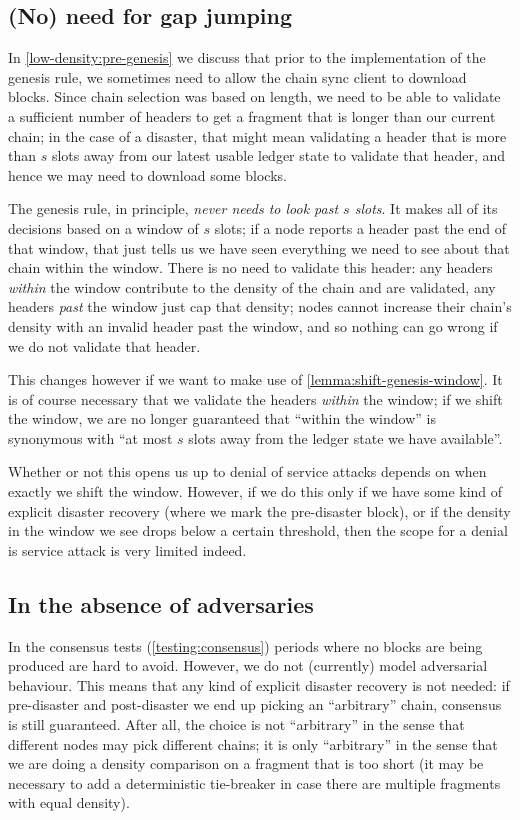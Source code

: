 \pagebreak

\subsection{(No) need for gap jumping}

In \cref{low-density:pre-genesis} we discuss that prior to the implementation
of the genesis rule, we sometimes need to allow the chain sync client to
download blocks. Since chain selection was based on length, we need to be able
to validate a sufficient number of headers to get a fragment that is longer
than our current chain; in the case of a disaster, that might mean validating
a header that is more than $s$ slots away from our latest usable ledger state
to validate that header, and hence we may need to download some blocks.

The genesis rule, in principle, \emph{never needs to look past $s$ slots}.
It makes all of its decisions based on a window of $s$ slots; if a node reports
a header past the end of that window, that just tells us we have seen everything
we need to see about that chain within the window. There is no need to validate
this header: any headers \emph{within} the window contribute to the density
of the chain and are validated, any headers \emph{past} the window just cap
that density; nodes cannot increase their chain's density with an invalid
header past the window, and so nothing can go wrong if we do not validate that
header.

This changes however if we want to make use of \cref{lemma:shift-genesis-window}.
It is of course necessary that we validate the headers \emph{within} the window;
if we shift the window, we are no longer guaranteed that ``within the window''
is synonymous with ``at most $s$ slots away from the ledger state we have
available''.

Whether or not this opens us up to denial of service attacks depends
on when exactly we shift the window. However, if we do this only if we have some
kind of explicit disaster recovery (where we mark the pre-disaster block),
or if the density in the window we see drops below a certain threshold, then
the scope for a denial is service attack is very limited indeed.

\subsection{In the absence of adversaries}

In the consensus tests (\cref{testing:consensus}) periods where no blocks are
being produced are hard to avoid. However, we do not (currently) model
adversarial behaviour. This means that any kind of explicit disaster recovery is
not needed: if pre-disaster and post-disaster we end up picking an ``arbitrary''
chain, consensus is still guaranteed. After all, the choice is not ``arbitrary''
in the sense that different nodes may pick different chains; it is only
``arbitrary'' in the sense that we are doing a density comparison on a fragment
that is too short (it may be necessary to add a deterministic tie-breaker in
case there are multiple fragments with equal density).
